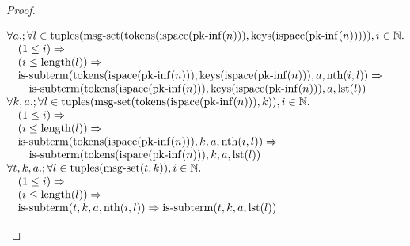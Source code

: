\documentclass[11pt]{article}
\theoremstyle{plain}
\begin{document}
\begin{proof}
\begin{itemize}[leftmargin=2.8em, itemsep=4pt, parsep=1pt]
\begin{itemize}[leftmargin=2.8em, itemsep=4pt, parsep=1pt]
\begin{equation*}
\begin{array}{@{}l@{}}
\begin{array}{@{}l@{}} \forall a.; \forall l \in \operatorname{tuples}(\operatorname{msg\text{-}set}(\operatorname{tokens}(\operatorname{ispace}(\operatorname{pk\text{-}inf}(n))), \operatorname{keys}(\operatorname{ispace}(\operatorname{pk\text{-}inf}(n))))), i \in \mathbb{N}. \\ \quad (1 \leq i) \Rightarrow  \\ \quad (i \leq \operatorname{length}(l)) \Rightarrow  \\ \quad \operatorname{is\text{-}subterm}(\operatorname{tokens}(\operatorname{ispace}(\operatorname{pk\text{-}inf}(n))), \operatorname{keys}(\operatorname{ispace}(\operatorname{pk\text{-}inf}(n))), a, \operatorname{nth}(i, l)) \Rightarrow  \\ \quad \quad \operatorname{is\text{-}subterm}(\operatorname{tokens}(\operatorname{ispace}(\operatorname{pk\text{-}inf}(n))), \operatorname{keys}(\operatorname{ispace}(\operatorname{pk\text{-}inf}(n))), a, \operatorname{lst}(l)) \end{array} \\
\begin{array}{@{}l@{}} \forall k, a.; \forall l \in \operatorname{tuples}(\operatorname{msg\text{-}set}(\operatorname{tokens}(\operatorname{ispace}(\operatorname{pk\text{-}inf}(n))), k)), i \in \mathbb{N}. \\ \quad (1 \leq i) \Rightarrow  \\ \quad (i \leq \operatorname{length}(l)) \Rightarrow  \\ \quad \operatorname{is\text{-}subterm}(\operatorname{tokens}(\operatorname{ispace}(\operatorname{pk\text{-}inf}(n))), k, a, \operatorname{nth}(i, l)) \Rightarrow  \\ \quad \quad \operatorname{is\text{-}subterm}(\operatorname{tokens}(\operatorname{ispace}(\operatorname{pk\text{-}inf}(n))), k, a, \operatorname{lst}(l)) \end{array} \\
\begin{array}{@{}l@{}} \forall t, k, a.; \forall l \in \operatorname{tuples}(\operatorname{msg\text{-}set}(t, k)), i \in \mathbb{N}. \\ \quad (1 \leq i) \Rightarrow  \\ \quad (i \leq \operatorname{length}(l)) \Rightarrow  \\ \quad \operatorname{is\text{-}subterm}(t, k, a, \operatorname{nth}(i, l)) \Rightarrow \operatorname{is\text{-}subterm}(t, k, a, \operatorname{lst}(l)) \end{array} \\

\end{array}
\end{equation*}
\end{itemize}
\end{itemize}
\end{proof}
\end{document}
